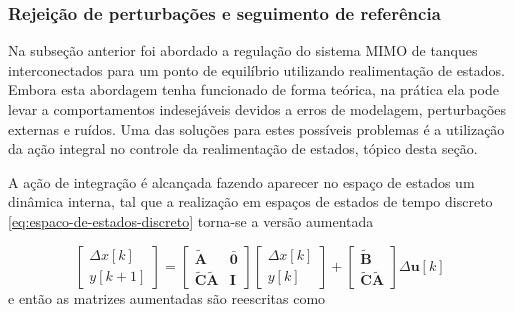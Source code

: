 \subsubsection{Rejeição de perturbações e seguimento de referência}
\label{subsub:rejeicao-de-perturbacoes-e-seguimento-de-referencia}

Na subseção anterior foi abordado a regulação do sistema MIMO de tanques
interconectados para um ponto de equilíbrio utilizando realimentação de estados.
Embora esta abordagem tenha funcionado de forma teórica, na prática ela pode
levar a comportamentos indesejáveis devidos a erros de modelagem, perturbações
externas e ruídos. Uma das soluções para estes possíveis problemas é a
utilização da ação integral no controle da realimentação de estados, tópico
desta seção.

A ação de integração é alcançada fazendo aparecer no espaço de estados um
dinâmica interna, tal que a realização em espaços de estados de tempo discreto
\ref{eq:espaco-de-estados-discreto} torna-se a versão aumentada

\begin{equation}
    \label{eq:espaco-de-estados-discreto-aumentado}
    \begin{bmatrix}
        \Delta x[k]\\ 
        y[k+1]
    \end{bmatrix}
    =
    \begin{bmatrix}
        \mathbf{\tilde{A}} & \mathbf{\bar{0}}\\ 
        \mathbf{\tilde{C}}\mathbf{\tilde{A}} & \mathbf{I}
    \end{bmatrix}
    \begin{bmatrix}
        \Delta x[k]\\ 
        y[k]
    \end{bmatrix}
    +
    \begin{bmatrix}
        \mathbf{\tilde{B}}\\ 
        \mathbf{\tilde{C}}\mathbf{\tilde{A}}
    \end{bmatrix}
    \Delta \mathbf{u}[k]
\end{equation} e então as matrizes aumentadas são reescritas como

